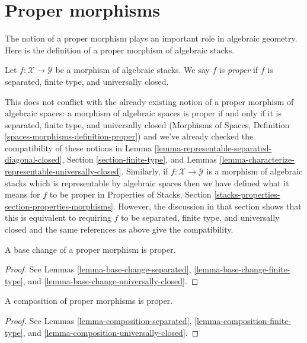 \section{Proper morphisms}
\label{section-proper}

\noindent
The notion of a proper morphism plays an important role in algebraic geometry.
Here is the definition of a proper morphism of algebraic stacks.

\begin{definition}
\label{definition-proper}
Let $f : \mathcal{X} \to \mathcal{Y}$
be a morphism of algebraic stacks.
We say $f$ is {\it proper} if $f$ is separated, finite type, and
universally closed.
\end{definition}

\noindent
This does not conflict with the already existing notion of a proper morphism
of algebraic spaces: a morphism of algebraic spaces is proper if and only if
it is separated, finite type, and universally closed
(Morphisms of Spaces, Definition \ref{spaces-morphisms-definition-proper})
and we've already checked the compatibility of these notions in
Lemma \ref{lemma-representable-separated-diagonal-closed},
Section \ref{section-finite-type}, and
Lemmas \ref{lemma-characterize-representable-universally-closed}.
Similarly, if $f : \mathcal{X} \to \mathcal{Y}$ is a
morphism of algebraic stacks which is representable by algebraic spaces
then we have defined what it means for $f$ to be proper in
Properties of Stacks, Section
\ref{stacks-properties-section-properties-morphisms}.
However, the discussion in that section shows that this is
equivalent to requiring $f$ to be separated, finite type, and
universally closed and the same references as above give the
compatibility.

\begin{lemma}
\label{lemma-base-change-proper}
A base change of a proper morphism is proper.
\end{lemma}

\begin{proof}
See
Lemmas \ref{lemma-base-change-separated},
\ref{lemma-base-change-finite-type}, and
\ref{lemma-base-change-universally-closed}.
\end{proof}

\begin{lemma}
\label{lemma-composition-proper}
A composition of proper morphisms is proper.
\end{lemma}

\begin{proof}
See
Lemmas \ref{lemma-composition-separated},
\ref{lemma-composition-finite-type}, and
\ref{lemma-composition-universally-closed}.
\end{proof}

